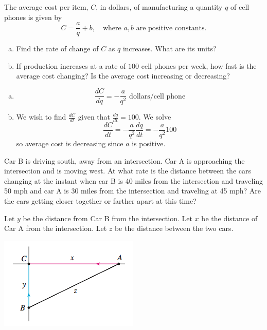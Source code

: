 \documentclass[11pt]{exam}
\begin{document}
\begin{questions}
  \question The average cost per item, \(C\), in dollars, of
    manufacturing a quantity \(q\) of cell phones is given by \[
      C = \frac{a}{q}  + b, \quad \text{where }a,b\text{ are positive constants.}
    \]
    \begin{enumerate}[(a)]
    \item Find the rate of change of \(C\) as \(q\) increases. What
      are its units?
    \item If production increases at a rate of \(100\) cell phones per
      week, how fast is the average cost changing? Is the average cost
      increasing or decreasing?
    \end{enumerate}
    \begin{solution}
      \begin{enumerate}[(a)]
      \item \[
          \frac{dC}{dq} = -\frac{a}{q^2} \text{ dollars/cell phone}
        \]
      \item We wish to find \(\frac{dC}{dt}\) given that
        \(\frac{dq}{dt} = 100\). We solve \[
          \frac{dC}{dt} = -\frac{a}{q^2} \frac{dq}{dt} =
          -\frac{a}{q^2}100
        \]
        so average cost is decreasing since \(a\) is positive.
      \end{enumerate}
    \end{solution}
  \question Car B is driving south, away from an intersection.  Car A is approaching the intersection and is moving west.  At what rate is the distance between the cars changing at the instant when car B is 40 miles from the intersection and traveling 50 mph and car A is 30 miles from the intersection and traveling at 45 mph?  Are the cars getting closer together or farther apart at this time?
    \begin{solution}
      Let \(y\) be the distance from Car B from the intersection. Let
      \(x\) be the distance of Car A from the intersection. Let \(z\)
      be the distance between the two cars.
      \begin{center}
        \includegraphics[scale=0.7]{Figures/cars-at-intersection}
      \end{center}

\end{solution}
\end{questions}
\end{document}
